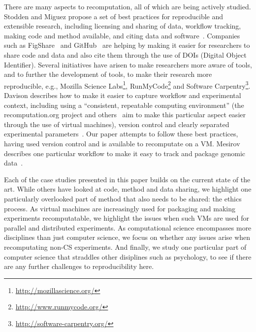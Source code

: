 There are many aspects to recomputation, all of which are being
actively studied. Stodden and Miguez propose a set of best practices
for reproducible and extensible research, including licensing and
sharing of data, workflow tracking, making code and method available,
and citing data and software~\cite{stodden:practices}. 
Companies such as FigShare~\cite{figshare:citable} and
GitHub~\cite{github:citable} are helping by making it easier for
researchers to share code and data and also cite them through the use
of DOIs (Digital Object Identifier). Several initiatives have arisen
to make researchers more aware of tools, and to further the
development of tools, to make their research more reproducible, e.g.,
Mozilla Science Labs\footnote{\url{http://mozillascience.org/}},
RunMyCode\footnote{\url{http://www.runmycode.org/}} and 
Software Carpentry\footnote{\url{http://software-carpentry.org/}}. Davison
describes how to make it easier to capture workflow and experimental
context, including using a ``consistent, repeatable computing
environment'' (the recomputation.org project and
others~\cite{howe:reproducible} aim to make this particular aspect
easier through the use of virtual machines), version control and
clearly separated experimental
parameters~\cite{davison:reproducibility}. Our paper attempts to
follow these best practices, having used version control and is
available to recomputate on a VM.  Mesirov describes one particular
workflow to make it easy to track and package genomic
data~\cite{mesirov:accessible}. 

Each of the case studies presented in this paper builds on the current
state of the art. While others have looked at code, method and data
sharing, we highlight one particularly overlooked part of method that
also needs to be shared: the ethics process. As virtual machines are
increasingly used for packaging and making experiments recomputatable,
we highlight the issues when such VMs are used for parallel and
distributed experiments. As computational science encompasses more
disciplines than just computer science, we focus on whether any issues
arise when recomputating non-CS experiments. And finally, we study one
particular part of computer science that straddles other disiplines
such as psychology, to see if there are any further challenges to
reproducibility here.
%
%
